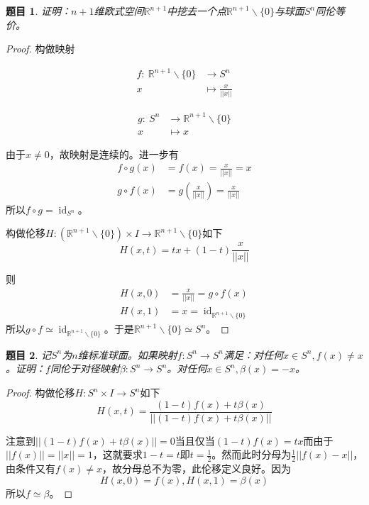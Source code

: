 \documentclass[UTF-8,11pt,fancyhdr,hyperref,titlepage]{ctexart}
\theoremstyle{question}
\newtheorem{timu}{题目}
\theoremstyle{theorem}
\theoremstyle{definition}
\theoremstyle{remark}
\def\RR{{\mathbb R}}
\def\longto{\longrightarrow}
\def\To{\longto}
\newcommand{\mapdes}[5]
  {
    \begin{align*}
      #1\colon\  #2 & \longrightarrow  #3 \\
            #4 & \longmapsto  #5
    \end{align*}
  }
\DeclareMathOperator{\id}{id}
\begin{document}
\begin{timu}\label{5}
  证明：$n+1$维欧式空间$\RR^{n+1}$中挖去一个点$\RR^{n+1}\backslash\{0\}$与球面$S^n$同伦等价。
\end{timu}
\begin{proof}
  构做映射
  \begin{center}
  \parbox{0.4\linewidth}{\mapdes{f}{\RR^{n+1}\backslash\{0\}}{S^n}{x}{\frac{x}{||x||}}}
  \parbox{0.4\linewidth}{\mapdes{g}{S^n}{\RR^{n+1}\backslash\{0\}}{x}{x}}
  \end{center}
  
  由于$x\neq0$，故映射是连续的。进一步有
  \begin{align*}
    f\circ g (x) &=f(x)=\frac{x}{||x||}=x \\
    g\circ f(x) &=g(\frac{x}{||x||})=\frac{x}{||x||}
  \end{align*}
  所以$f\circ g=\id_{S^n}$。

  构做伦移$H\colon(\RR^{n+1}\backslash\{0\})\times I\To \RR^{n+1}\backslash\{0\}$如下
  \begin{equation*}
    H(x,t)=tx+(1-t)\frac{x}{||x||}
  \end{equation*}
  
  则
  \begin{align*}
    H(x,0)&=\frac{x}{||x||}=g\circ f(x)\\
    H(x,1)&=x=\id_{\RR^{n+1}\backslash\{0\}}
  \end{align*}
  所以$g\circ f\simeq\id_{\RR^{n+1}\backslash\{0\}}$。于是$\RR^{n+1}\backslash\{0\}\simeq S^n$。
\end{proof}

\begin{timu}\label{6}
  记$S^n$为$n$维标准球面。如果映射$f\colon S^n\To S^n$满足：对任何$x\in S^n, f(x)\neq x$。证明：$f$同伦于对径映射$\beta\colon S^n\To S^n$。对任何$x\in S^n, \beta(x)=-x$。
\end{timu}
\begin{proof}
  构做伦移$H\colon S^n\times I\To S^n$如下
  \begin{equation*}
    H(x,t)=\frac{(1-t)f(x)+t\beta(x)}{||(1-t)f(x)+t\beta(x)||}
  \end{equation*}
  
  注意到$||(1-t)f(x)+t\beta(x)||=0$当且仅当$(1-t)f(x)=tx$而由于$||f(x)||=||x||=1$，这就要求$1-t=t$即$t=\frac{1}{2}$。然而此时分母为$\frac{1}{2}||f(x)-x||$，由条件又有$f(x)\neq x$，故分母总不为零，此伦移定义良好。因为
  \begin{equation*}
     H(x,0)=f(x),  H(x,1)=\beta(x)
  \end{equation*}
  所以$f\simeq\beta$。
\end{proof}
\end{document}
